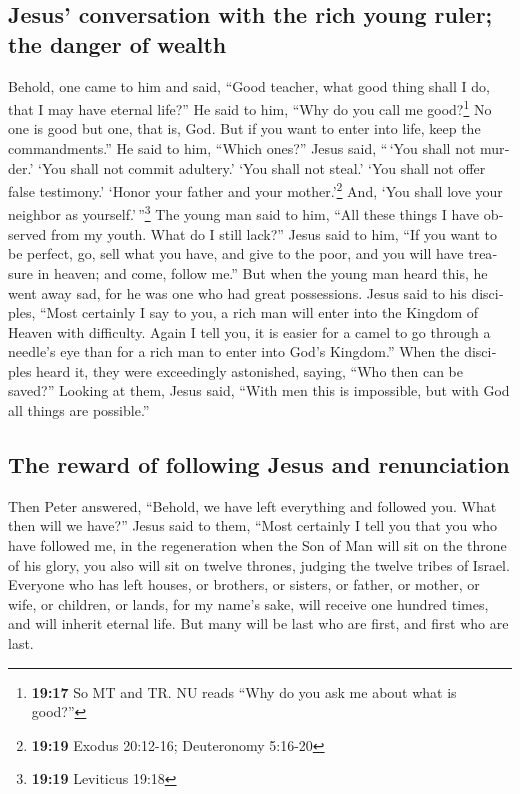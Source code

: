 \begin{paracol}{2}
\begin{otherlanguage}{english}
\hypertarget{jesus-conversation-with-the-rich-young-ruler-the-danger-of-wealth}{%
\subsection{Jesus' conversation with the rich young ruler; the danger of
wealth}\label{jesus-conversation-with-the-rich-young-ruler-the-danger-of-wealth}}

 Behold, one came to him and said, ``Good teacher, what
good thing shall I do, that I may have eternal life?'' 
He said to him, ``Why do you call me good?\footnote{\textbf{19:17} So MT
  and TR. NU reads ``Why do you ask me about what is good?''} No one is
good but one, that is, God. But if you want to enter into life, keep the
commandments.''  He said to him, ``Which ones?'' Jesus
said, ``\,`You shall not murder.' `You shall not commit adultery.' `You
shall not steal.' `You shall not offer false testimony.' 
`Honor your father and your mother.'\footnote{\textbf{19:19} Exodus
  20:12-16; Deuteronomy 5:16-20} And, `You shall love your neighbor as
yourself.'\,''\footnote{\textbf{19:19} Leviticus 19:18} 
The young man said to him, ``All these things I have observed from my
youth. What do I still lack?''  Jesus said to him, ``If
you want to be perfect, go, sell what you have, and give to the poor,
and you will have treasure in heaven; and come, follow me.''
 But when the young man heard this, he went away sad, for
he was one who had great possessions.  Jesus said to his
disciples, ``Most certainly I say to you, a rich man will enter into the
Kingdom of Heaven with difficulty.  Again I tell you, it
is easier for a camel to go through a needle's eye than for a rich man
to enter into God's Kingdom.''  When the disciples heard
it, they were exceedingly astonished, saying, ``Who then can be saved?''
 Looking at them, Jesus said, ``With men this is
impossible, but with God all things are possible.''

\hypertarget{the-reward-of-following-jesus-and-renunciation}{%
\subsection{The reward of following Jesus and
renunciation}\label{the-reward-of-following-jesus-and-renunciation}}

 Then Peter answered, ``Behold, we have left everything
and followed you. What then will we have?''  Jesus said
to them, ``Most certainly I tell you that you who have followed me, in
the regeneration when the Son of Man will sit on the throne of his
glory, you also will sit on twelve thrones, judging the twelve tribes of
Israel.  Everyone who has left houses, or brothers, or
sisters, or father, or mother, or wife, or children, or lands, for my
name's sake, will receive one hundred times, and will inherit eternal
life.  But many will be last who are first, and first who
are last.


\end{otherlanguage}
\end{paracol}
